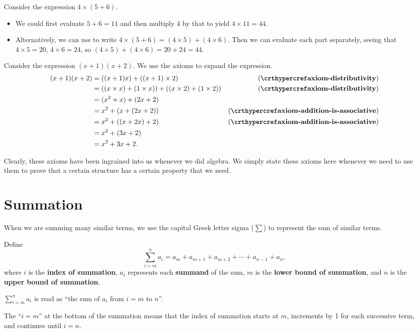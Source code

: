 \begin{example}
    Consider the expression $4\times(5+6)$.
    \begin{itemize}
        \item We could first evaluate $5+6=11$ and then multiply 4 by that to yield $4\times11=44$.
        \item Alternatively, we can use  to write $4\times(5+6) = (4\times5)+(4\times6)$. Then we can evaluate each part separately, seeing that $4\times5 = 20$, $4\times6 = 24$, so $(4\times5)+(4\times6) = 20+24=44$.
    \end{itemize}
\end{example}
\begin{example}
    Consider the expression $(x+1)(x+2)$. We use the axioms to expand the expression.
    \begin{align*}
        (x+1)(x+2) &= ((x+1)x) + ((x+1)\times2) & (\myref{axiom-distributivity})\\
        &= ((x\times x) + (1\times x)) + ((x\times2) + (1\times2)) & (\myref{axiom-distributivity})\\
        &= (x^2+x) + (2x+2)\\
        &= x^2+(x + (2x+2)) & (\myref{axiom-addition-is-associative})\\
        &= x^2+((x + 2x)+2) & (\myref{axiom-addition-is-associative})\\
        &= x^2 + (3x+2)\\
        &= x^2 + 3x + 2.
    \end{align*}
\end{example}

Clearly, these axioms have been ingrained into us whenever we did algebra. We simply state these axioms here whenever we need to use them to prove that a certain structure has a certain property that we need.

\section{Summation}
When we are summing many similar terms, we use the capital Greek letter sigma ($\sum$) to represent the sum of similar terms. 
\begin{definition}
    Define
    \[
        \sum_{i=m}^{n}a_i = a_m + a_{m+1} + a_{m+2} + \cdots + a_{n-1} + a_n,
    \]
    where $i$ is the \textbf{index of summation}, $a_i$ represents each \textbf{summand} of the sum, $m$ is the \textbf{lower bound of summation}, and $n$ is the \textbf{upper bound of summation}.
\end{definition}
\begin{remark}
    $\displaystyle \sum_{i=m}^{n}a_i$ is read as ``the sum of $a_i$ from $i=m$ to $n$''.
\end{remark}
\begin{remark}
    The ``$i = m$'' at the bottom of the summation means that the index of summation starts at $m$, increments by 1 for each successive term, and continues until $i = n$.
\end{remark}

